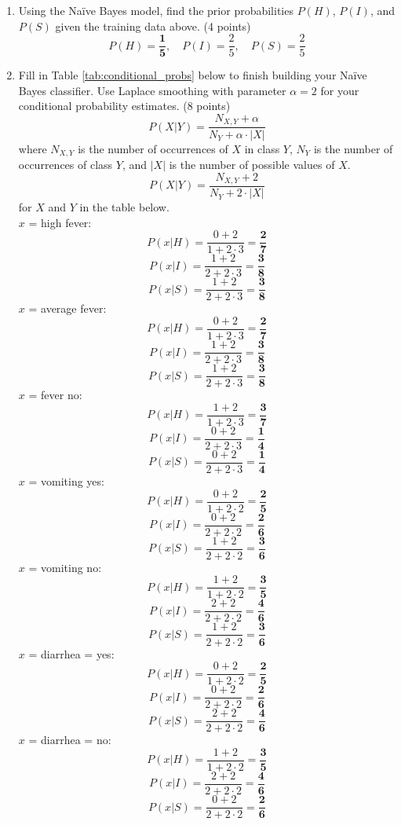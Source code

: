 \documentclass[a3paper,12pt]{article} %
\begin{document}
\begin{enumerate}
    \item Using the Na\"ive Bayes model, find the prior probabilities \( P(H) \), \( P(I) \), and \( P(S) \) given the training data above. (4 points)
    \[
    P(H) = \mathbf{\frac{1}{5}}, \quad P(I) = \frac{2}{5}, \quad P(S) = \frac{2}{5}
    \]
    \item Fill in Table \ref{tab:conditional_probs} below to finish building your Na\"ive Bayes classifier. Use Laplace smoothing with parameter \( \alpha = 2 \) for your conditional probability estimates. (8 points)
    \[
    P(X|Y) = \frac{N_{X,Y} + \alpha}{N_Y + \alpha \cdot |X|}
    \]
    where \( N_{X,Y} \) is the number of occurrences of \( X \) in class \( Y \), \( N_Y \) is the number of occurrences of class \( Y \), and \( |X| \) is the number of possible values of \( X \).
    \[
    P(X|Y) = \frac{N_{X,Y} + 2}{N_Y + 2 \cdot |X|}
    \]
    for \( X \) and \( Y \) in the table below.
    \\ \(x\) = high fever:
    \[
    P(x|H) = \frac{0 + 2}{1 + 2 \cdot 3} = \mathbf{\frac{2}{7}}
    \] 
    \[
    P(x|I) = \frac{1 + 2}{2 + 2 \cdot 3} = \mathbf{\frac{3}{8}}
    \]
    \[
    P(x|S) = \frac{1 + 2}{2 + 2 \cdot 3} = \mathbf{\frac{3}{8}}
    \]
    \(x\) = average fever:
    \[
    P(x|H) = \frac{0 + 2}{1 + 2 \cdot 3} = \mathbf{\frac{2}{7}}
    \]
    \[
    P(x|I) = \frac{1 + 2}{2 + 2 \cdot 3} = \mathbf{\frac{3}{8}}
    \]
    \[
    P(x|S) = \frac{1 + 2}{2 + 2 \cdot 3} = \mathbf{\frac{3}{8}}
    \]
    \(x\) = fever no:
    \[
    P(x|H) = \frac{1 + 2}{1 + 2 \cdot 3} = \mathbf{\frac{3}{7}}
    \]
    \[
    P(x|I) = \frac{0 + 2}{2 + 2 \cdot 3} = \mathbf{\frac{1}{4}}
    \]
    \[
    P(x|S) = \frac{0 + 2}{2 + 2 \cdot 3} = \mathbf{\frac{1}{4}}
    \]
    \(x\) = vomiting yes:
    \[
    P(x|H) = \frac{0 + 2}{1 + 2 \cdot 2} = \mathbf{\frac{2}{5}}
    \]
    \[
    P(x|I) = \frac{0 + 2}{2 + 2 \cdot 2} = \mathbf{\frac{2}{6}}
    \]
    \[
    P(x|S) = \frac{1 + 2}{2 + 2 \cdot 2} = \mathbf{ \frac{3}{6}}
    \]
    \(x\) = vomiting no:
    \[
    P(x|H) = \frac{1 + 2}{1 + 2 \cdot 2} = \mathbf{\frac{3}{5}}
    \]
    \[
    P(x|I) = \frac{2 + 2}{2 + 2 \cdot 2} = \mathbf{\frac{4}{6}}
    \]
    \[
    P(x|S) = \frac{1 + 2}{2 + 2 \cdot 2} = \mathbf{\frac{3}{6}}
    \]
    \(x\) = diarrhea = yes:
    \[
    P(x|H) = \frac{0 + 2}{1 + 2 \cdot 2} = \mathbf{\frac{2}{5}}
    \]
    \[
    P(x|I) = \frac{0 + 2}{2 + 2 \cdot 2} = \mathbf{\frac{2}{6}}
    \]
    \[
    P(x|S) = \frac{2 + 2}{2 + 2 \cdot 2} = \mathbf{\frac{4}{6}}
    \]
    \(x\) = diarrhea = no:
    \[
    P(x|H) = \frac{1 + 2}{1 + 2 \cdot 2} = \mathbf{\frac{3}{5}}
    \]
    \[
    P(x|I) = \frac{2 + 2}{2 + 2 \cdot 2} = \mathbf{\frac{4}{6}}
    \]
    \[
    P(x|S) = \frac{0 + 2}{2 + 2 \cdot 2} = \mathbf{\frac{2}{6}}
    \]
    

\end{enumerate}
\end{document}
